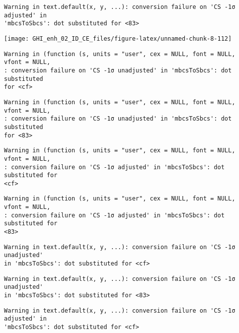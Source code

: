 \documentclass[
  10pt,
  a4paper,oneside]{article}
\begin{document}
\begin{verbatim}
Warning in text.default(x, y, ...): conversion failure on 'CS -1σ adjusted' in
'mbcsToSbcs': dot substituted for <83>
\end{verbatim}

\begin{center}\texttt{[image: GHI\_enh\_02\_ID\_CE\_files/figure-latex/unnamed-chunk-8-112]} \end{center}

\begin{verbatim}
Warning in (function (s, units = "user", cex = NULL, font = NULL, vfont = NULL,
: conversion failure on 'CS -1σ unadjusted' in 'mbcsToSbcs': dot substituted
for <cf>
\end{verbatim}

\begin{verbatim}
Warning in (function (s, units = "user", cex = NULL, font = NULL, vfont = NULL,
: conversion failure on 'CS -1σ unadjusted' in 'mbcsToSbcs': dot substituted
for <83>
\end{verbatim}

\begin{verbatim}
Warning in (function (s, units = "user", cex = NULL, font = NULL, vfont = NULL,
: conversion failure on 'CS -1σ adjusted' in 'mbcsToSbcs': dot substituted for
<cf>
\end{verbatim}

\begin{verbatim}
Warning in (function (s, units = "user", cex = NULL, font = NULL, vfont = NULL,
: conversion failure on 'CS -1σ adjusted' in 'mbcsToSbcs': dot substituted for
<83>
\end{verbatim}

\begin{verbatim}
Warning in text.default(x, y, ...): conversion failure on 'CS -1σ unadjusted'
in 'mbcsToSbcs': dot substituted for <cf>
\end{verbatim}

\begin{verbatim}
Warning in text.default(x, y, ...): conversion failure on 'CS -1σ unadjusted'
in 'mbcsToSbcs': dot substituted for <83>
\end{verbatim}

\begin{verbatim}
Warning in text.default(x, y, ...): conversion failure on 'CS -1σ adjusted' in
'mbcsToSbcs': dot substituted for <cf>
\end{verbatim}
\end{document}
